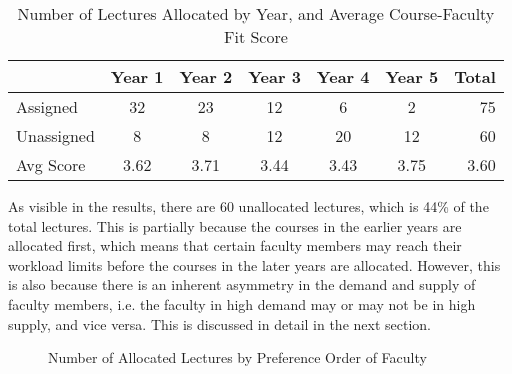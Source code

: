\begin{table}[H]
  \centering
  \begin{tabular}{|l|c|c|c|c|c|r|}
    \hline
               & \textbf{Year 1} & \textbf{Year 2} & \textbf{Year 3} & \textbf{Year 4} & \textbf{Year 5} & \textbf{Total} \\ \hline
    Assigned   & 32              & 23              & 12              & 6               & 2               & 75             \\ \hline
    Unassigned & 8               & 8               & 12              & 20              & 12              & 60             \\ \hline
    Avg Score  & 3.62            & 3.71            & 3.44            & 3.43            & 3.75            & 3.60           \\ \hline
  \end{tabular}
  \caption{Number of Lectures Allocated by Year, and Average Course-Faculty Fit Score}
  \label{tab:lec_alloc_results}
\end{table}

As visible in the results, there are 60 unallocated lectures, which is 44\% of the total lectures. This is partially because the courses in the earlier years are allocated first, which means that certain faculty members may reach their workload limits before the courses in the later years are allocated. However, this is also because there is an inherent asymmetry in the demand and supply of faculty members, i.e. the faculty in high demand may or may not be in high supply, and vice versa. This is discussed in detail in the next section.

\begin{figure}[H]
  \centering
  \caption{Number of Allocated Lectures by Preference Order of Faculty}
  \label{fig:pref_order}
\end{figure}

